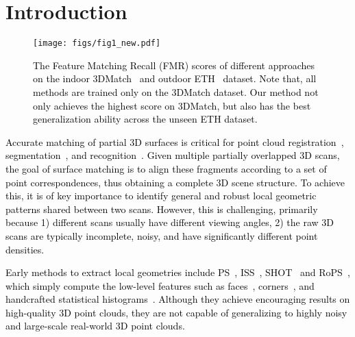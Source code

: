 \documentclass[final]{cvpr}
\newcommand{\qy}[1]{\textcolor{black}{#1}}
\newcommand{\bo}[1]{\textcolor{black}{#1}}
\begin{document}
\section{Introduction}
\label{sec:Intro}
\begin{figure}[t]
	\begin{center}
		\texttt{[image: figs/fig1\_new.pdf]}
	\end{center}
    \caption{\qy{The Feature Matching Recall (FMR) scores of different approaches on the indoor 3DMatch~\cite{Zeng2017} and outdoor ETH~\cite{pomerleau2012challenging} dataset. Note that, all methods are trained only on the 3DMatch dataset. Our method not only achieves the highest score on 3DMatch, but also has the best generalization ability across the unseen ETH dataset. 
    }}
	\label{fig: generalization}
\end{figure}

\qy{
\bo{Accurate matching of partial 3D surfaces is critical for} point cloud registration~\cite{Elbaz2017,Lu2019,Choy2020,Gojcic2020a,huang2020feature}, segmentation~\cite{yang2019learning,hu2020randla,guo2020deep}, and recognition~\cite{guo20143d,Defferrard2020,Rao2019}. Given multiple partially overlapped 3D scans, the goal of surface matching is to align these fragments according to a set of point correspondences, thus obtaining a complete 3D scene structure. \bo{To achieve this, it is of key importance to identify general and robust local geometric patterns shared between two scans. However, this is challenging, primarily because 1) different scans usually have different viewing angles, 2) the raw 3D scans are typically incomplete, noisy, and have significantly different point densities.} 
}

\qy{Early methods to extract local geometries include PS~\cite{chua1997point}, ISS~\cite{Zhong2010Intrinsic}, SHOT~\cite{mian2010repeatability} and RoPS~\cite{guo2013rotational}, which simply compute the low-level features such as faces~\cite{mian2006three,zaharescu2009surface}, corners~\cite{stein1992structural}, and handcrafted statistical histograms~\cite{novatnack2008scale}. \bo{Although they achieve encouraging results on high-quality 3D point clouds, they are not capable of generalizing to highly noisy and large-scale real-world 3D point clouds.}
}
\end{document}
